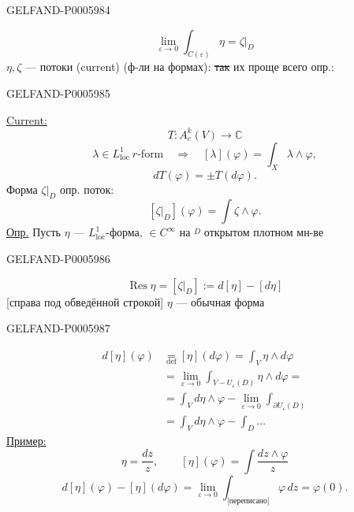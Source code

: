 \begin{GelfandAdjacentEvidence}{GELFAND-P000598}{4}

\[
\lim_{\varepsilon\to0}\int_{C(\varepsilon)}\eta=\zeta|_D
\]
\(\eta,\zeta\) — потоки (current) (ф-ли на формах): \sout{так} их проще всего опр.:
\end{GelfandAdjacentEvidence}
\begin{GelfandAdjacentEvidence}{GELFAND-P000598}{5}


\underline{Current:}
\[
T:A_c^k(V)\to\mathbb C
\]
\[
\lambda\in L_{\mathrm{loc}}^1\ r\text{-form}\quad\Rightarrow\quad
[\lambda](\varphi)=\int_X\lambda\wedge\varphi,
\]
\[
dT(\varphi)=\pm T(d\varphi).
\]
Форма \(\zeta|_D\) опр. поток:
\[
[\zeta|_D](\varphi)=\int\zeta\wedge\varphi.
\]
\underline{Опр.} Пусть \(\eta\) — \(L_{\mathrm{loc}}^1\)-форма,
\(\in C^\infty\) на \(\overset{D}{\phantom{.}}\) открытом плотном мн-ве
\end{GelfandAdjacentEvidence}
\begin{GelfandAdjacentEvidence}{GELFAND-P000598}{6}

\[
\operatorname{Res}\eta=[\zeta|_D]:=d[\eta]-[d\eta]
\]
[справа под обведённой строкой] \(\eta\) — обычная форма
\end{GelfandAdjacentEvidence}
\begin{GelfandAdjacentEvidence}{GELFAND-P000598}{7}


\noindent{}\par
\[
\begin{aligned}
d[\eta](\varphi)&\underset{\mathrm{def}}{=}[\eta](d\varphi)
   =\int_V\eta\wedge d\varphi\\
&=\lim_{\varepsilon\to0}\int_{V-U_\varepsilon(D)}\eta\wedge d\varphi=\\
&=\int_V d\eta\wedge\varphi-\lim_{\varepsilon\to0}\int_{\partial U_\varepsilon(D)}\\
&=\int_V d\eta\wedge\varphi-\int_D\ldots
\end{aligned}
\]
\underline{Пример:}
\[
\eta=\frac{dz}{z},\qquad [\eta](\varphi)=\int\frac{dz\wedge\varphi}{z}
\]
\[
d[\eta](\varphi)-[\eta](d\varphi)=
\lim_{\varepsilon\to0}\int_{\text{[переписано]}}\varphi\,dz=\varphi(0).
\]
\end{GelfandAdjacentEvidence}
